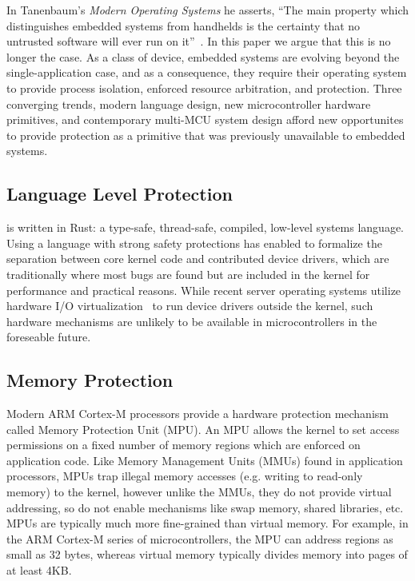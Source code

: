 In Tanenbaum's \emph{Modern Operating Systems} he asserts, ``The main property
which distinguishes embedded systems from handhelds is the certainty that no
untrusted software will ever run on it''~\cite{tanenbaum}. In this paper we
argue that this is no longer the case. As a class of device, embedded systems
are evolving beyond the single-application case, and as a consequence, they
require their operating system to provide process isolation, enforced resource
arbitration, and protection.
%
Three converging trends, modern language design, new microcontroller hardware
primitives, and contemporary multi-MCU system design afford new opportunites
to provide protection as a primitive that was previously unavailable to
embedded systems.



\subsection{Language Level Protection}

\name is written in Rust: a type-safe, thread-safe, compiled, low-level systems
language. Using a language with strong safety protections has enabled \name to
formalize the separation between core kernel code and contributed device
drivers, which are traditionally where most bugs are found but are included in
the kernel for performance and practical reasons. While recent server operating
systems utilize hardware I/O virtualization~\cite{arrakis:osdi2014, ix:osdi2014}
to run device drivers outside the kernel, such hardware mechanisms are unlikely
to be available in microcontrollers in the foreseable future.

\subsection{Memory Protection}

Modern ARM Cortex-M processors provide a hardware protection mechanism called
Memory Protection Unit (MPU).  An MPU allows the kernel to set access
permissions on a fixed number of memory regions which are enforced on
application code. Like Memory Management Units (MMUs) found in application
processors, MPUs trap illegal memory accesses (e.g. writing to read-only memory)
to the kernel, however unlike the MMUs, they do not provide virtual addressing,
so do not enable mechanisms like swap memory, shared libraries, etc. MPUs are
typically much more fine-grained than virtual memory. For example, in the ARM
Cortex-M series of microcontrollers, the MPU can address regions as small as 32
bytes, whereas virtual memory typically divides memory into pages of at least
4KB.

